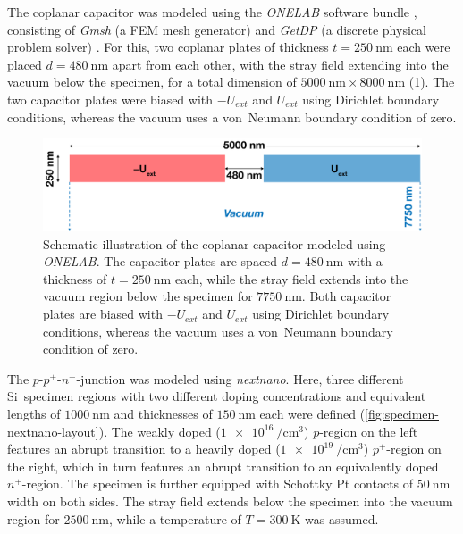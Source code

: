 The coplanar capacitor was modeled using the \emph{ONELAB} software bundle \cite{Geuzaine2013}, consisting of \emph{Gmsh} (a FEM mesh generator) \cite{Geuzaine2009} and \emph{GetDP} (a discrete physical problem solver) \cite{Dular1998}. For this, two coplanar plates of thickness $t = \SI{250}{\nm}$ each were placed $d = \SI{480}{\nm}$ apart from each other, with the stray field extending into the vacuum below the specimen, for a total dimension of $\SI{5000}{\nm} \times \SI{8000}{\nm}$ (\cref{fig:specimen-capacitor-layout}). The two capacitor plates were biased with $-U_{ext}$ and $U_{ext}$ using Dirichlet boundary conditions, whereas the vacuum uses a von~Neumann boundary condition of zero.
\begin{figure}[H]
	\centering
	\includegraphics[width=\textwidth]{Figures/Specimen/Capacitor/specimen-capacitor-layout.pdf}
	\caption{Schematic illustration of the coplanar capacitor modeled using \emph{ONELAB}. The capacitor plates are spaced $d = \SI{480}{\nm}$ with a thickness of $t = \SI{250}{\nm}$ each, while the stray field extends into the vacuum region below the specimen for $\SI{7750}{\nm}$. Both capacitor plates are biased with $-U_{ext}$ and $U_{ext}$ using Dirichlet boundary conditions, whereas the vacuum uses a von~Neumann boundary condition of zero.}
	\label{fig:specimen-capacitor-layout}
\end{figure}
The $p$-$p^+$-$n^+$-junction was modeled using \emph{nextnano}. Here, three different Si~specimen regions with two different doping concentrations and equivalent lengths of $\SI{1000}{\nm}$ and thicknesses of $\SI{150}{\nm}$ each were defined (\cref{fig:specimen-nextnano-layout}). The weakly doped ($\SI[per-mode=power]{1e16}{\per\cubic\cm}$) $p$-region on the left features an abrupt transition to a heavily doped ($\SI[per-mode=power]{1e19}{\per\cubic\cm}$) $p^+$-region on the right, which in turn features an abrupt transition to an equivalently doped $n^+$-region. The specimen is further equipped with Schottky Pt contacts of $\SI{50}{\nm}$ width on both sides. The stray field extends below the specimen into the vacuum region for $\SI{2500}{\nm}$, while a temperature of $T = \SI{300}{\kelvin}$ was assumed.

